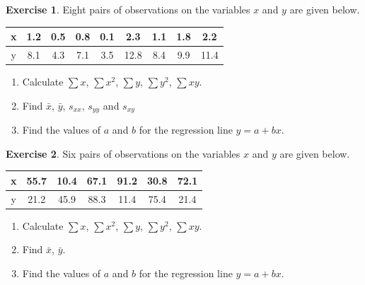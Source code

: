 \documentclass[
]{book}
\theoremstyle{definition}
\theoremstyle{definition}
\theoremstyle{definition}
\newtheorem{exercise}{Exercise}[chapter]
\theoremstyle{definition}
\theoremstyle{remark}
\begin{document}
\begin{exercise}

Eight pairs of observations on the variables \(x\) and \(y\) are given below.

\begin{longtable}[]{@{}ccccccccc@{}}
\toprule
x & 1.2 & 0.5 & 0.8 & 0.1 & 2.3 & 1.1 & 1.8 & 2.2\tabularnewline
\midrule
\endhead
y & 8.1 & 4.3 & 7.1 & 3.5 & 12.8 & 8.4 & 9.9 & 11.4\tabularnewline
\bottomrule
\end{longtable}

\begin{enumerate}
\def\labelenumi{\alph{enumi})}
\item
  Calculate \(\sum x\), \(\sum x^2\), \(\sum y\), \(\sum y^2\), \(\sum xy\).
\item
  Find \(\bar{x}\), \(\bar{y}\), \(s_{xx}\), \(s_{yy}\) and \(s_{xy}\)
\item
  Find the values of \(a\) and \(b\) for the regression line \(y=a+bx\).
\end{enumerate}

\end{exercise}

\begin{exercise}

Six pairs of observations on the variables \(x\) and \(y\) are given below.

\begin{longtable}[]{@{}ccccccc@{}}
\toprule
x & 55.7 & 10.4 & 67.1 & 91.2 & 30.8 & 72.1\tabularnewline
\midrule
\endhead
y & 21.2 & 45.9 & 88.3 & 11.4 & 75.4 & 21.4\tabularnewline
\bottomrule
\end{longtable}

\begin{enumerate}
\def\labelenumi{\alph{enumi})}
\item
  Calculate \(\sum x\), \(\sum x^2\), \(\sum y\), \(\sum y^2\), \(\sum xy\).
\item
  Find \(\bar{x}\), \(\bar{y}\).
\item
  Find the values of \(a\) and \(b\) for the regression line \(y=a+bx\).
\end{enumerate}

\end{exercise}
\end{document}

